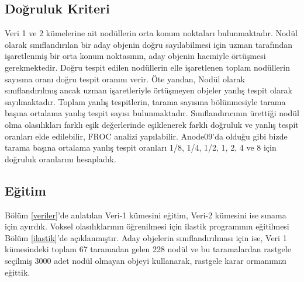 \documentclass[conference]{IEEEtran}
\begin{document}
\subsection{Doğruluk Kriteri}
Veri 1 ve 2 kümelerine ait nodüllerin orta konum noktaları bulunmaktadır. Nodül olarak sınıflandırılan bir aday objenin doğru sayılabilmesi için uzman tarafından işaretlenmiş bir orta konum noktasının, aday objenin hacmiyle örtüşmesi gerekmektedir. Doğru tespit edilen nodüllerin elle işaretlenen toplam nodüllerin sayısına oranı doğru tespit oranını verir. Öte yandan, Nodül olarak sınıflandırılmış ancak uzman işaretleriyle örtüşmeyen objeler yanlış tespit olarak sayılmaktadır. Toplam yanlış tespitlerin, tarama sayısına bölünmesiyle tarama başına ortalama yanlış tespit sayısı bulunmaktadır.
Sınıflandırıcının ürettiği nodül olma olasılıkları farklı eşik değerlerinde eşiklenerek farklı doğruluk ve yanlış tespit oranları elde edilebilir, FROC analizi yapılabilir. Anode09\cite{anode09}'da olduğu gibi bizde tarama başına ortalama yanlış tespit oranları 1/8, 1/4, 1/2, 1, 2, 4 ve 8 için doğruluk oranlarını hesapladık.
\subsection{Eğitim}
Bölüm \ref{veriler}'de anlatılan Veri-1 kümesini eğitim, Veri-2 kümesini ise sınama için ayırdık. Voksel olasılıklarının öğrenilmesi için ilastik \cite{sommer2011} programının eğitilmesi Bölüm \ref{ilastik}'de açıklanmıştır. Aday objelerin sınıflandırılması için ise, Veri 1 kümesindeki toplam 67 taramadan gelen 228 nodül ve bu taramalardan rastgele seçilmiş 3000 adet nodül olmayan objeyi kullanarak, rastgele karar ormanımızı eğittik.
\end{document}
